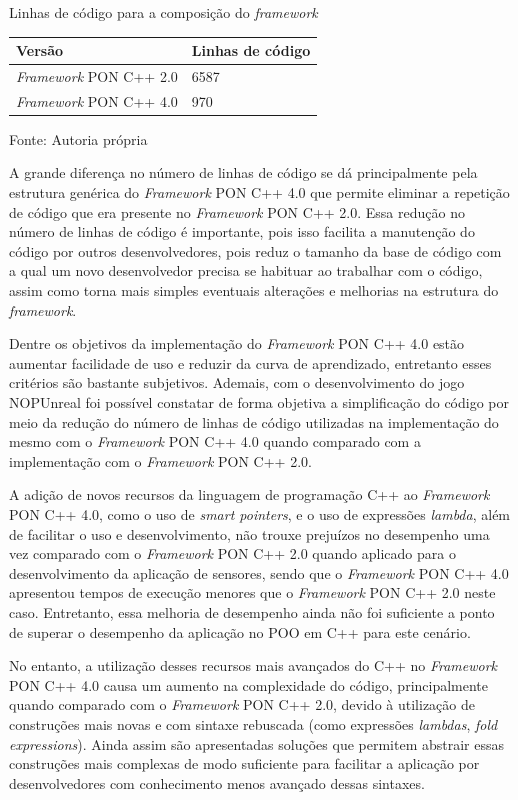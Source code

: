 \begin{tabframed}[!htb]
\centering
\caption{Linhas de código para a composição do \textit{framework}}
\smallskip
\begin{tabularx}{0.8\textwidth}{|X|X|}
\hline
Versão & Linhas de código\\
\hline
\textit{Framework} PON C++ 2.0 & 6587 \\
\hline
\textit{Framework} PON C++ 4.0 & 970 \\
\hline
\end{tabularx}
\caption*{Fonte: Autoria própria}
\label{tab:linhas_de_codigo}
\end{tabframed}

A grande diferença no número de linhas de código se dá principalmente pela
estrutura genérica do \textit{Framework} PON C++ 4.0 que permite eliminar a
repetição de código que era presente no \textit{Framework} PON C++ 2.0. Essa
redução no número de linhas de código é importante, pois isso facilita a
manutenção do código por outros desenvolvedores, pois reduz o tamanho da base de
código com a qual um novo desenvolvedor precisa se habituar ao trabalhar com o
código, assim como torna mais simples eventuais alterações e melhorias na
estrutura do \textit{framework}.

Dentre os objetivos da implementação do \textit{Framework} PON C++ 4.0 estão
aumentar facilidade de uso e reduzir da curva de aprendizado, entretanto esses
critérios são bastante subjetivos. Ademais, com o desenvolvimento do jogo
NOPUnreal foi possível constatar de forma objetiva a simplificação do código por
meio da redução do número de linhas de código utilizadas na implementação do
mesmo com o \textit{Framework} PON C++ 4.0 quando comparado com a implementação
com o \textit{Framework} PON C++ 2.0.

A adição de novos recursos da linguagem de programação C++ ao \textit{Framework}
PON C++ 4.0, como o uso de \textit{smart pointers}, e o uso de expressões
\textit{lambda}, além de facilitar o uso e desenvolvimento, não trouxe prejuízos
no desempenho uma vez comparado com o \textit{Framework} PON C++ 2.0 quando
aplicado para o desenvolvimento da aplicação de sensores, sendo que o
\textit{Framework} PON C++ 4.0 apresentou tempos de execução menores que o
\textit{Framework} PON C++ 2.0 neste caso. Entretanto, essa melhoria de
desempenho ainda não foi suficiente a ponto de superar o desempenho da aplicação
no POO em C++ para este cenário.

No entanto, a utilização desses recursos mais avançados do C++ no
\textit{Framework} PON C++ 4.0 causa um aumento na complexidade do código,
principalmente quando comparado com o \textit{Framework} PON C++ 2.0, devido à
utilização de construções mais novas e com sintaxe rebuscada (como expressões
\textit{lambdas}, \textit{fold expressions}). Ainda assim são apresentadas
soluções que permitem abstrair essas construções mais complexas de modo
suficiente para facilitar a aplicação por desenvolvedores com conhecimento menos
avançado dessas sintaxes.

